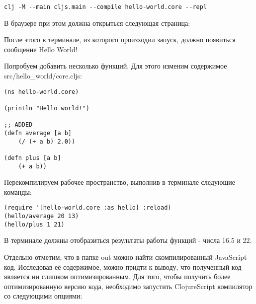 \begin{center}
	\captionsetup{justification=raggedright,singlelinecheck=off}
	\begin{lstlisting}[label=lst:clojurehelloworld-1,caption=Запуск в терминале]
clj -M --main cljs.main --compile hello-world.core --repl
	\end{lstlisting}
\end{center}

В браузере при этом должна открыться следующая страница:


После этого в терминале, из которого произходил запуск, должно появиться сообщение Hello World!

Попробуем добавить несколько функций. Для этого изменим содержимое src/hello\_world/core.cljs:

\begin{center}
	\captionsetup{justification=raggedright,singlelinecheck=off}
	\begin{lstlisting}[label=lst:clojurehelloworld-1,caption=Содержимое src/hello\_world/core.cljs]
(ns hello-world.core)

(println "Hello world!")

;; ADDED
(defn average [a b]
	(/ (+ a b) 2.0))
	
(defn plus [a b]
	(+ a b))
	\end{lstlisting}
\end{center}

Перекомпилируем рабочее пространство, выполнив в терминале следующие команды:

\begin{center}
	\captionsetup{justification=raggedright,singlelinecheck=off}
	\begin{lstlisting}[label=lst:clojurehelloworld-2,caption=Обновление страницы проверка новых функций ]
(require '[hello-world.core :as hello] :reload)
(hello/average 20 13)
(hello/plus 1 21)
\end{lstlisting}
\end{center}

В терминале должны отобразиться результаты работы функций - числа 16.5 и 22.

Отдельно отметим, что в папке out можно найти скомпилированный \newline JavaScript код.
Исследовав её содержимое, можно придти к выводу, что полученный  код является ни слишком оптимизированным.
Для того, чтобы получить более оптимизированную версию кода, необходимо запустить ClojureScript компилятор со следующими опциями:

